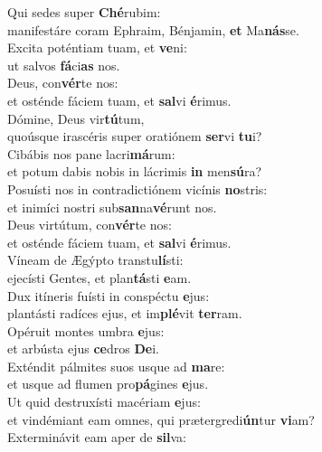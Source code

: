 \evenverse Qui sedes super \textbf{Ché}rubim:~\*\\
\evenverse manifestáre coram Ephraim, Bénjamin, \textbf{et} Ma\textbf{nás}se.\\
\oddverse Excita poténtiam tuam, et \textbf{ve}ni:~\*\\
\oddverse ut salvos \textbf{fá}ci\textbf{as} nos.\\
\evenverse Deus, con\textbf{vér}te nos:~\*\\
\evenverse et osténde fáciem tuam, et \textbf{sal}vi \textbf{é}rimus.\\
\oddverse Dómine, Deus vir\textbf{tú}tum,~\*\\
\oddverse quoúsque irascéris super oratiónem \textbf{ser}vi \textbf{tu}i?\\
\evenverse Cibábis nos pane lacri\textbf{má}rum:~\*\\
\evenverse et potum dabis nobis in lácrimis \textbf{in} men\textbf{sú}ra?\\
\oddverse Posuísti nos in contradictiónem vicínis \textbf{no}stris:~\*\\
\oddverse et inimíci nostri sub\textbf{san}na\textbf{vé}runt nos.\\
\evenverse Deus virtútum, con\textbf{vér}te nos:~\*\\
\evenverse et osténde fáciem tuam, et \textbf{sal}vi \textbf{é}rimus.\\
\oddverse Víneam de Ægýpto transtu\textbf{lí}sti:~\*\\
\oddverse ejecísti Gentes, et plan\textbf{tá}sti \textbf{e}am.\\
\evenverse Dux itíneris fuísti in conspéctu \textbf{e}jus:~\*\\
\evenverse plantásti radíces ejus, et im\textbf{plé}vit \textbf{ter}ram.\\
\oddverse Opéruit montes umbra \textbf{e}jus:~\*\\
\oddverse et arbústa ejus \textbf{ce}dros \textbf{De}i.\\
\evenverse Exténdit pálmites suos usque ad \textbf{ma}re:~\*\\
\evenverse et usque ad flumen pro\textbf{pá}gines \textbf{e}jus.\\
\oddverse Ut quid destruxísti macériam \textbf{e}jus:~\*\\
\oddverse et vindémiant eam omnes, qui prætergredi\textbf{ún}tur \textbf{vi}am?\\
\evenverse Exterminávit eam aper de \textbf{sil}va:~\*\\
